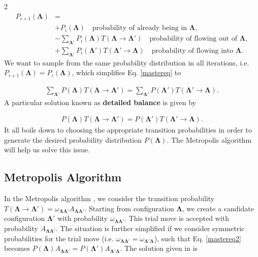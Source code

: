 \documentclass{article}
\begin{document}
\begin{multicols}{2}
\begin{align}
    P_{i+1}(\boldsymbol{\Lambda}) &= \nonumber \\ 
    &+ P_i(\boldsymbol{\Lambda}) \quad \text{probability of already being in } \boldsymbol{\Lambda}, \nonumber \\
    &- \sum_{\boldsymbol{\Lambda}'}P_i(\boldsymbol{\Lambda})T(\boldsymbol{\Lambda} \to \boldsymbol{\Lambda}')  \quad \text{probability of flowing out of } \boldsymbol{\Lambda}, \nonumber \\
    &+ \sum_{\boldsymbol{\Lambda}'}P_i(\boldsymbol{\Lambda}')T(\boldsymbol{\Lambda}'\to \boldsymbol{\Lambda})  \quad \text{probability of flowing into } \boldsymbol{\Lambda}.
    \label{mastereq}
\end{align}
%
We want to sample from the same probability distribution in all iterations, i.e. $P_{i+1}(\boldsymbol{\Lambda}) = P_i(\boldsymbol{\Lambda})$, which simplifies Eq. \eqref{mastereq} to 

\begin{align}
    \sum_{\boldsymbol{\Lambda}'}P(\boldsymbol{\Lambda})T(\boldsymbol{\Lambda} \to \boldsymbol{\Lambda}') =
    \sum_{\boldsymbol{\Lambda}'}P(\boldsymbol{\Lambda}')T(\boldsymbol{\Lambda}'\to \boldsymbol{\Lambda}).
\end{align}
%
A particular solution known as \textbf{detailed balance} is given by

\begin{align}
    P(\boldsymbol{\Lambda})T(\boldsymbol{\Lambda} \to \boldsymbol{\Lambda}') =
    P(\boldsymbol{\Lambda}')T(\boldsymbol{\Lambda}'\to \boldsymbol{\Lambda}).
    \label{mastereq2}
\end{align}
%
It all boils down to choosing the appropriate transition probabilities in order to generate the desired probability distribution $P(\boldsymbol{\Lambda})$. The Metropolis algorithm will help us solve this issue.

\subsection{Metropolis Algorithm}
\label{section_metropolis}

In the Metropolis algorithm \cite{computational_book}, we consider the transition probability $T(\boldsymbol{\Lambda}\to \boldsymbol{\Lambda}') = \omega_{\boldsymbol{\Lambda}\boldsymbol{\Lambda}'}A_{\boldsymbol{\Lambda}\boldsymbol{\Lambda}'}$. Starting from configuration $\boldsymbol{\Lambda}$, we create a candidate configuration $\boldsymbol{\Lambda}'$ with probability $\omega_{\boldsymbol{\Lambda}\boldsymbol{\Lambda}'}$. This trial move is accepted with probability $A_{\boldsymbol{\Lambda}\boldsymbol{\Lambda}'}$. The situation is further simplified if we consider symmetric probabilities for the trial move (i.e. $\omega_{\boldsymbol{\Lambda}\boldsymbol{\Lambda}'}=\omega_{\boldsymbol{\Lambda}'\boldsymbol{\Lambda}}$), such that Eq. \eqref{mastereq2} becomes $P(\boldsymbol{\Lambda})A_{\boldsymbol{\Lambda}\boldsymbol{\Lambda}'}=P(\boldsymbol{\Lambda}')A_{\boldsymbol{\Lambda}'\boldsymbol{\Lambda}}$. The solution given in \cite{metropolis} is


\end{multicols}
\end{document}
